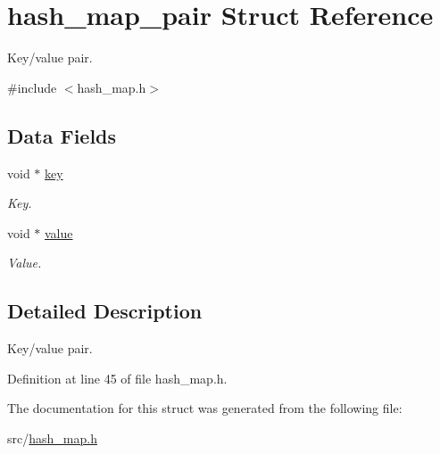 \hypertarget{structhash__map__pair}{\section{hash\-\_\-map\-\_\-pair Struct Reference}
\label{structhash__map__pair}
}


Key/value pair.  




{\ttfamily \#include $<$hash\-\_\-map.\-h$>$}

\subsection*{Data Fields}
\begin{DoxyCompactItemize}
\item 
\hypertarget{structhash__map__pair_ad9ce04e4327f49eb68248ff5bad64b75}{void $\ast$ \hyperlink{structhash__map__pair_ad9ce04e4327f49eb68248ff5bad64b75}{key}}\label{structhash__map__pair_ad9ce04e4327f49eb68248ff5bad64b75}

\begin{DoxyCompactList}\small\item\em Key. \end{DoxyCompactList}\item 
\hypertarget{structhash__map__pair_ae994720bf7ac2094c08b16e5f64a467b}{void $\ast$ \hyperlink{structhash__map__pair_ae994720bf7ac2094c08b16e5f64a467b}{value}}\label{structhash__map__pair_ae994720bf7ac2094c08b16e5f64a467b}

\begin{DoxyCompactList}\small\item\em Value. \end{DoxyCompactList}\end{DoxyCompactItemize}


\subsection{Detailed Description}
Key/value pair. 

Definition at line 45 of file hash\-\_\-map.\-h.



The documentation for this struct was generated from the following file\-:\begin{DoxyCompactItemize}
\item 
src/\hyperlink{hash__map_8h}{hash\-\_\-map.\-h}\end{DoxyCompactItemize}
